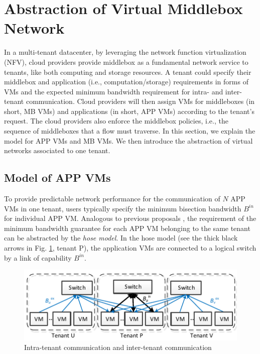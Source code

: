 \documentclass[review]{elsarticle}
\begin{document}
\section{Abstraction of Virtual Middlebox Network}\label{sec:abstraction}
In a multi-tenant datacenter, by leveraging the network function virtualization (NFV), cloud providers provide middlebox as a fundamental network service to tenants, like both computing and storage resources. A tenant could specify their middlebox and application (i.e., computation/storage) requirements in forms of VMs and the expected minimum bandwidth requirement for intra- and inter-tenant communication. Cloud providers will then assign VMs for middleboxes (in short, MB VMs) and applications (in short, APP VMs) according to the tenant's request. The cloud providers also enforce the middlebox policies, i.e., the sequence of middleboxes that a flow must traverse. In this section, we explain the model for APP VMs and MB VMs. We then introduce the abstraction of virtual networks associated to one tenant.


\subsection{Model of APP VMs}
To provide predictable network performance for the communication of $N$ APP VMs in one tenant, users typically specify the minimum bisection bandwidth $B^{in}$ for individual APP VM. Analogous to previous proposals \cite{B13cta, P12fst}, the requirement of the minimum bandwidth guarantee for each APP VM belonging to the same tenant can be abstracted by the \emph{hose model}. In the hose model (see the thick black arrows in Fig. \ref{fig:hose}, tenant P), the application VMs are connected to a logical switch by a link of capability $B^{in}$.

\begin{figure}
	\centering
		\includegraphics[width=3.5 in]{fig/tagmodel.pdf}
	\caption{Intra-tenant communication and inter-tenant communication}
	\label{fig:hose}
\end{figure}
\end{document}
